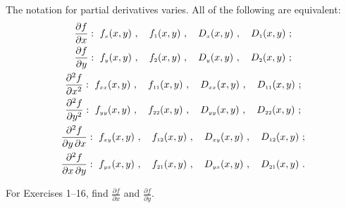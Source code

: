 The notation for partial derivatives varies. 
All of the following are equivalent:
\begin{gather*}
 \dfrac{\partial f}{\partial x}:~ f_{\scriptscriptstyle x}(x,y) ~, \quad f_{\scriptscriptstyle 1}(x,y) ~, \quad D_{\scriptscriptstyle x}(x,y) ~, \quad
  D_{\scriptscriptstyle 1}(x,y)~;
  \\
 \dfrac{\partial f}{\partial y}:~ f_{\scriptscriptstyle y}(x,y) ~, \quad f_{\scriptscriptstyle 2}(x,y) ~, \quad D_{\scriptscriptstyle y}(x,y) ~, \quad
  D_{\scriptscriptstyle 2}(x,y)~;
  \\
 \dfrac{\partial^2 f}{\partial x^2}:~ f_{\scriptscriptstyle xx}(x,y) ~, \quad f_{\scriptscriptstyle 11}(x,y) ~, \quad D_{\scriptscriptstyle xx}(x,y) ~, \quad
  D_{\scriptscriptstyle 11}(x,y)~;
  \\
 \dfrac{\partial^2 f}{\partial y^2}:~ f_{\scriptscriptstyle yy}(x,y) ~, \quad f_{\scriptscriptstyle 22}(x,y) ~, \quad D_{\scriptscriptstyle yy}(x,y) ~, \quad
  D_{\scriptscriptstyle 22}(x,y)~;
  \\
 \dfrac{\partial^2 f}{\partial y \, \partial x}: ~ f_{\scriptscriptstyle xy}(x,y) ~, \quad f_{\scriptscriptstyle 12}(x,y) ~, \quad
  D_{\scriptscriptstyle xy}(x,y) ~, \quad
  D_{\scriptscriptstyle 12}(x,y)~;
  \\
 \dfrac{\partial^2 f}{\partial x \, \partial y}: ~ f_{\scriptscriptstyle yx}(x,y) ~, \quad f_{\scriptscriptstyle 21}(x,y) ~, \quad
  D_{\scriptscriptstyle yx}(x,y) ~, \quad
  D_{\scriptscriptstyle 21}(x,y)~.
\end{gather*}
\centerline{}\label{sec2dot2}
\par\noindent For Exercises 1--16, find $\frac{\partial f}{\partial x}$ and $\frac{\partial f}{\partial y}$.
